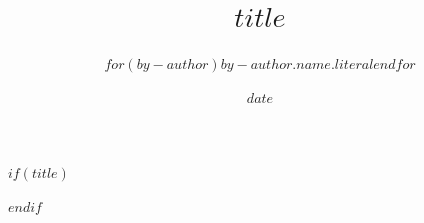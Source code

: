 $if(title)$
\title{$title$}
$endif$
\author{$for(by-author)$$by-author.name.literal$$endfor$}
\date{$date$}
\newcommand{\titulotesis}{$title$}
\newcommand{\autortesis}{$for(by-author)$$by-author.name.literal$$endfor$}
\newcommand{\afiliacionestesis}{$for(by-author)$$for(by-author.affiliations)$$by-author.affiliations.name$$sep$\\ $endfor$$endfor$}
\newcommand{\guiatesis}{$guia$}
\newcommand{\cotutortesis}{$cotutor$}
\newcommand{\fechatesis}{$date$}
\renewcommand{\maketitle}{}
